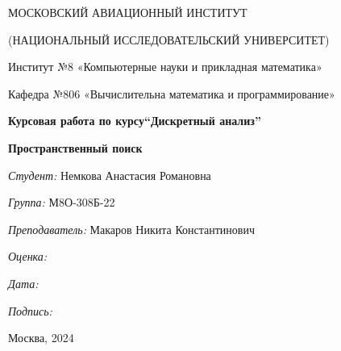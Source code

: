 \documentclass[12pt]{article}
\begin{document}
\thispagestyle{empty}	
\begin{center}
	МОСКОВСКИЙ АВИАЦИОННЫЙ ИНСТИТУТ
	
	(НАЦИОНАЛЬНЫЙ ИССЛЕДОВАТЕЛЬСКИЙ УНИВЕРСИТЕТ)
\vspace{3ex}

	Институт №8 «Компьютерные науки и прикладная математика»
    
	Кафедра №806 «Вычислительна математика и программирование»
	
\end{center}
\vspace{25ex}
\begin{center}
	\textbf{\large{Курсовая работа по курсу\linebreak \textquotedblleft Дискретный анализ\textquotedblright}}
\end{center}
\vspace{3ex}
\begin{center}
    \textbf{\large{Пространственный поиск}}
\end{center}
\vspace{20ex}
\begin{flushright}
	\textit{Студент: } Немкова Анастасия Романовна
	
	\vspace{2ex}
	\textit{Группа: } М8О-308Б-22
	
	\vspace{2ex}
	\textit{Преподаватель: } Макаров Никита Константинович 
	
	\vspace{2ex}
	\textit{Оценка: } \underline{\quad\quad\quad\quad\quad\quad}
	
	 \vspace{2ex}
	\textit{Дата: } \underline{\quad\quad\quad\quad\quad\quad}
	
	\vspace{2ex}
	\textit{Подпись: } \underline{\quad\quad\quad\quad\quad\quad}
	
\end{flushright}
\vspace{5ex}

\begin{vfill}
	\begin{center}
		Москва, 2024
	\end{center}	
\end{vfill}
\newpage
\end{document}
